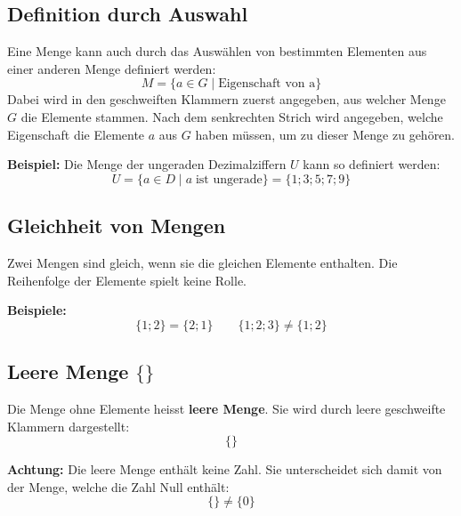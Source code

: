 \subsection{Definition durch Auswahl}

Eine Menge kann auch durch das Auswählen von bestimmten Elementen aus einer anderen Menge definiert werden:
\[
  M = \{ a \in G\mid \text{Eigenschaft von a} \}
\]
Dabei wird in den geschweiften Klammern zuerst angegeben, aus welcher Menge $G$ die Elemente stammen. Nach dem senkrechten Strich wird angegeben, welche Eigenschaft die Elemente $a$ aus $G$ haben müssen, um zu dieser Menge zu gehören.
\begin{example}
  \textbf{Beispiel:} Die Menge der ungeraden Dezimalziffern $U$ kann so definiert werden:
  \[
    U = \{ a \in D \mid a \;\text{ist ungerade} \} = \{ 1; 3; 5; 7; 9 \}
  \]
\end{example}

\subsection{Gleichheit von Mengen}
Zwei Mengen sind gleich, wenn sie die gleichen Elemente enthalten. Die Reihenfolge der Elemente spielt keine Rolle.
\begin{example}
  \textbf{Beispiele:}
  \[
    \{1;2\} = \{2;1\} \qquad \{1;2;3\} \neq \{1;2\}
  \]
\end{example}

\subsection{Leere Menge $\{\}$}
Die Menge ohne Elemente heisst \textbf{leere Menge}. Sie wird durch leere geschweifte Klammern dargestellt:
\[
  \{ \}
\]
\begin{note}
  \textbf{Achtung:} Die leere Menge enthält keine Zahl. Sie unterscheidet sich damit von der Menge, welche die Zahl Null enthält:
  \[
    \{\} \neq \{0\}
  \]
\end{note}

